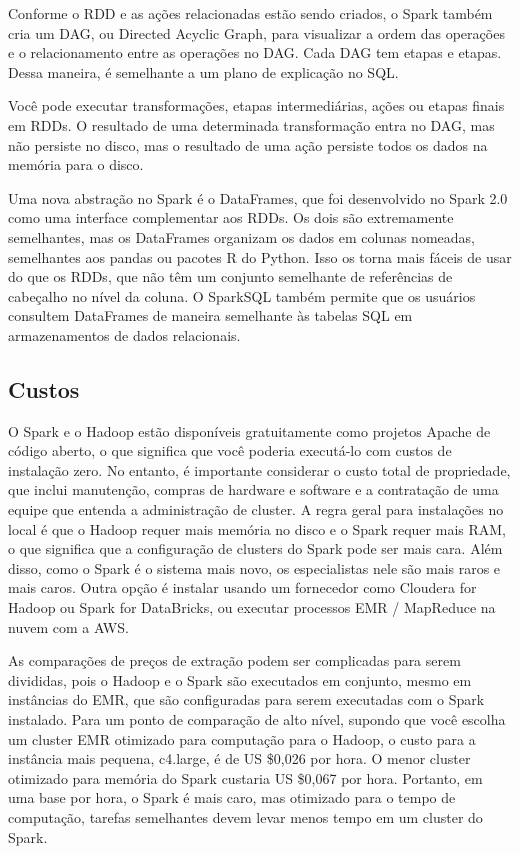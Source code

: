 Conforme o RDD e as ações relacionadas estão sendo criados, o Spark também cria um DAG, ou Directed Acyclic Graph, para visualizar a ordem das operações e o relacionamento entre as operações no DAG. Cada DAG tem etapas e etapas. Dessa maneira, é semelhante a um plano de explicação no SQL.  

Você pode executar transformações, etapas intermediárias, ações ou etapas finais em RDDs. O resultado de uma determinada transformação entra no DAG, mas não persiste no disco, mas o resultado de uma ação persiste todos os dados na memória para o disco.

Uma nova abstração no Spark é o DataFrames, que foi desenvolvido no Spark 2.0 como uma interface complementar aos RDDs. Os dois são extremamente semelhantes, mas os DataFrames organizam os dados em colunas nomeadas, semelhantes aos pandas ou pacotes R do Python. Isso os torna mais fáceis de usar do que os RDDs, que não têm um conjunto semelhante de referências de cabeçalho no nível da coluna. O SparkSQL também permite que os usuários consultem DataFrames de maneira semelhante às tabelas SQL em armazenamentos de dados relacionais.

\subsection{Custos}
\label{sec:cus}

O Spark e o Hadoop estão disponíveis gratuitamente como projetos Apache de código aberto, o que significa que você poderia executá-lo com custos de instalação zero. No entanto, é importante considerar o custo total de propriedade, que inclui manutenção, compras de hardware e software e a contratação de uma equipe que entenda a administração de cluster. A regra geral para instalações no local é que o Hadoop requer mais memória no disco e o Spark requer mais RAM, o que significa que a configuração de clusters do Spark pode ser mais cara. Além disso, como o Spark é o sistema mais novo, os especialistas nele são mais raros e mais caros. Outra opção é instalar usando um fornecedor como Cloudera for Hadoop ou Spark for DataBricks, ou executar processos EMR / MapReduce na nuvem com a AWS.

As comparações de preços de extração podem ser complicadas para serem divididas, pois o Hadoop e o Spark são executados em conjunto, mesmo em instâncias do EMR, que são configuradas para serem executadas com o Spark instalado. Para um ponto de comparação de alto nível, supondo que você escolha um cluster EMR otimizado para computação para o Hadoop, o custo para a instância mais pequena, c4.large, é de US \$0,026 por hora. O menor cluster otimizado para memória do Spark custaria US \$0,067 por hora. Portanto, em uma base por hora, o Spark é mais caro, mas otimizado para o tempo de computação, tarefas semelhantes devem levar menos tempo em um cluster do Spark.

